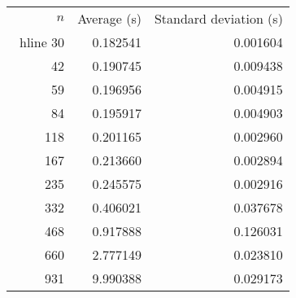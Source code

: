 \begin{tabular}{rrr}
$n$& Average (s) & Standard deviation (s)\\\ hline
30& 0.182541& 0.001604\\
42& 0.190745& 0.009438\\
59& 0.196956& 0.004915\\
84& 0.195917& 0.004903\\
118& 0.201165& 0.002960\\
167& 0.213660& 0.002894\\
235& 0.245575& 0.002916\\
332& 0.406021& 0.037678\\
468& 0.917888& 0.126031\\
660& 2.777149& 0.023810\\
931& 9.990388& 0.029173\\
\end{tabular}
